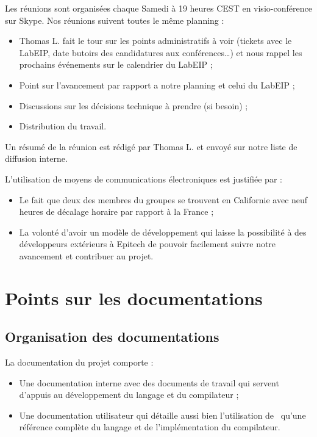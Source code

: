 \documentclass[francais]{rtxreport}
\begin{document}
Les réunions sont organisées chaque Samedi à 19 heures CEST en visio-conférence
sur Skype. Nos réunions suivent toutes le même planning :
\begin{itemize}
\item Thomas L. fait le tour sur les points administratifs à voir (tickets avec
  le LabEIP, date butoirs des candidatures aux conférences\ldots) et nous rappel
  les prochains événements sur le calendrier du LabEIP ;
\item Point sur l'avancement par rapport a notre planning et celui du LabEIP ;
\item Discussions sur les décisions technique à prendre (si besoin) ;
\item Distribution du travail.
\end{itemize}

Un résumé de la réunion est rédigé par Thomas L. et envoyé sur notre liste de
diffusion interne.

L'utilisation de moyens de communications électroniques est justifiée par :
\begin{itemize}
\item Le fait que deux des membres du groupes se trouvent en Californie avec
  neuf heures de décalage horaire par rapport à la France ;
\item La volonté d'avoir un modèle de développement qui laisse la possibilité à
  des développeurs extérieurs à Epitech de pouvoir facilement suivre notre
  avancement et contribuer au projet.
\end{itemize}

\chapter{Points sur les documentations}

\section{Organisation des documentations}

La documentation du projet comporte :
\begin{itemize}
\item Une documentation interne avec des documents de travail qui servent
  d'appuis au développement du langage et du compilateur ;
\item Une documentation utilisateur qui détaille aussi bien l'utilisation de
  \rtx\ qu'une référence complète du langage et de l'implémentation du
  compilateur.
\end{itemize}
\end{document}
